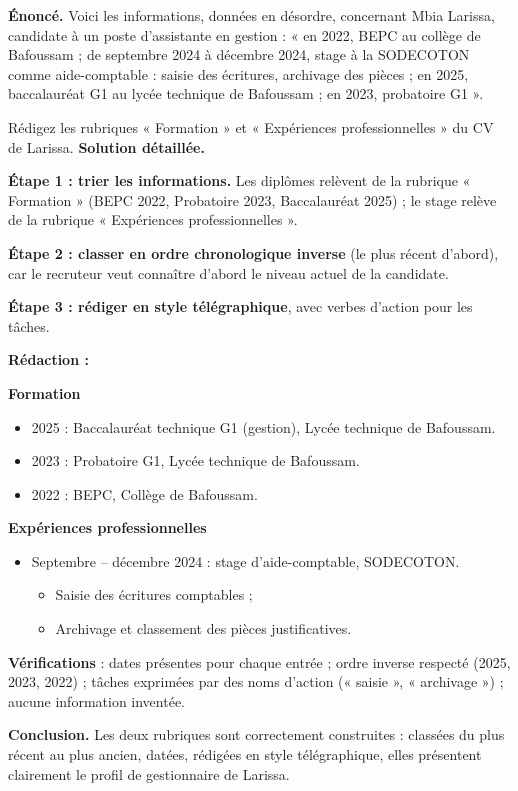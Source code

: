 \documentclass[11pt]{article}
\begin{document}
\begin{exoresolu}
\textbf{Énoncé.} Voici les informations, données en désordre, concernant Mbia Larissa, candidate à un poste d'assistante en gestion : « en 2022, BEPC au collège de Bafoussam ; de septembre 2024 à décembre 2024, stage à la SODECOTON comme aide-comptable : saisie des écritures, archivage des pièces ; en 2025, baccalauréat G1 au lycée technique de Bafoussam ; en 2023, probatoire G1 ».

Rédigez les rubriques « Formation » et « Expériences professionnelles » du CV de Larissa.
\tcblower
\textbf{Solution détaillée.}

\textbf{Étape 1 : trier les informations.} Les diplômes relèvent de la rubrique « Formation » (BEPC 2022, Probatoire 2023, Baccalauréat 2025) ; le stage relève de la rubrique « Expériences professionnelles ».

\textbf{Étape 2 : classer en ordre chronologique inverse} (le plus récent d'abord), car le recruteur veut connaître d'abord le niveau actuel de la candidate.

\textbf{Étape 3 : rédiger en style télégraphique}, avec verbes d'action pour les tâches.

\textbf{Rédaction :}

\textbf{Formation}
\begin{itemize}
\item 2025 : Baccalauréat technique G1 (gestion), Lycée technique de Bafoussam.
\item 2023 : Probatoire G1, Lycée technique de Bafoussam.
\item 2022 : BEPC, Collège de Bafoussam.
\end{itemize}

\textbf{Expériences professionnelles}
\begin{itemize}
\item Septembre -- décembre 2024 : stage d'aide-comptable, SODECOTON.
\begin{itemize}
\item Saisie des écritures comptables ;
\item Archivage et classement des pièces justificatives.
\end{itemize}
\end{itemize}

\textbf{Vérifications} : dates présentes pour chaque entrée ; ordre inverse respecté (2025, 2023, 2022) ; tâches exprimées par des noms d'action (« saisie », « archivage ») ; aucune information inventée.

\textbf{Conclusion.} Les deux rubriques sont correctement construites : classées du plus récent au plus ancien, datées, rédigées en style télégraphique, elles présentent clairement le profil de gestionnaire de Larissa.
\end{exoresolu}
\end{document}
